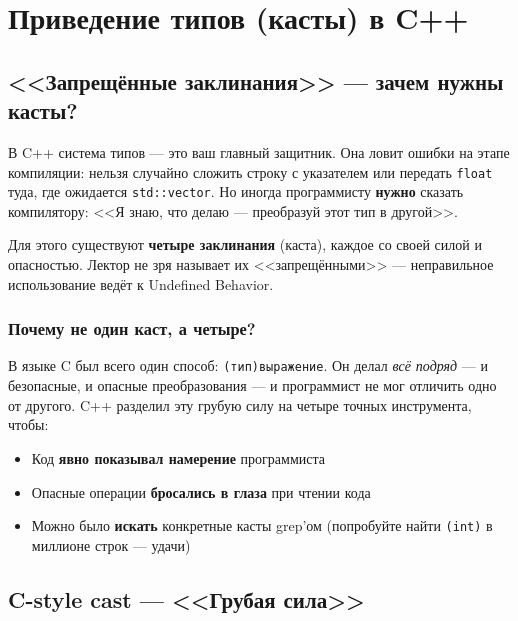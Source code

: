 \documentclass[a4paper,12pt]{article}
\begin{document}
\newpage
\section{Приведение типов (касты) в C++}

\subsection{<<Запрещённые заклинания>> --- зачем нужны касты?}

В C++ система типов --- это ваш главный защитник. Она ловит ошибки на этапе
компиляции: нельзя случайно сложить строку с указателем или передать \texttt{float}
туда, где ожидается \texttt{std::vector}. Но иногда программисту \textbf{нужно}
сказать компилятору: <<Я знаю, что делаю --- преобразуй этот тип в другой>>.

Для этого существуют \textbf{четыре заклинания} (каста), каждое со своей силой
и опасностью. Лектор не зря называет их <<запрещёнными>> --- неправильное
использование ведёт к Undefined Behavior.

\subsubsection{Почему не один каст, а четыре?}

В языке C был всего один способ: \texttt{(тип)выражение}. Он делал \textit{всё
подряд} --- и безопасные, и опасные преобразования --- и программист не мог отличить
одно от другого. C++ разделил эту грубую силу на четыре точных инструмента, чтобы:

\begin{itemize}
    \item Код \textbf{явно показывал намерение} программиста
    \item Опасные операции \textbf{бросались в глаза} при чтении кода
    \item Можно было \textbf{искать} конкретные касты grep'ом (попробуйте найти
          \texttt{(int)} в миллионе строк --- удачи)
\end{itemize}

\subsection{C-style cast --- <<Грубая сила>>}
\end{document}
